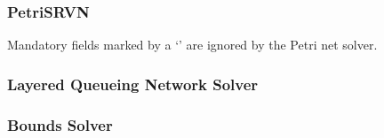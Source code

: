 \documentclass{article}
\begin{document}
\subsubsection{PetriSRVN}

Mandatory fields marked by a `\ddag' are ignored by the Petri net
solver.

\subsubsection{Layered Queueing Network Solver}


\subsubsection{Bounds Solver}
\end{document}
